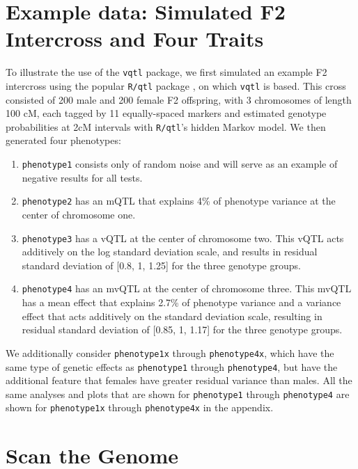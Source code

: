\documentclass[9pt,twocolumn,twoside]{gsag3jnl}
\begin{document}
\section*{Example data: Simulated F2 Intercross and Four Traits}

To illustrate the use of the \texttt{vqtl} package, we first simulated an example F2 intercross using the popular \texttt{R/qtl} package \citep{Broman2003}, on which \texttt{vqtl} is based.
This cross consisted of 200 male and 200 female F2 offspring, with 3 chromosomes of length 100 cM, each tagged by 11 equally-spaced markers and estimated genotype probabilities at 2cM intervals with \texttt{R/qtl}'s hidden Markov model. We then generated four phenotypes:
\begin{enumerate}
	\item \texttt{phenotype1} consists only of random noise and will serve as an example of negative results for all tests.
	\item \texttt{phenotype2} has an mQTL that explains 4\% of phenotype variance at the center of chromosome one.
	\item \texttt{phenotype3} has a vQTL at the center of chromosome two.
        This vQTL acts additively on the log standard deviation scale, and results in residual standard deviation of [0.8, 1, 1.25] for the three genotype groups.
	\item \texttt{phenotype4} has an mvQTL at the center of chromosome three.
        This mvQTL has a mean effect that explains 2.7\% of phenotype variance and a variance effect that acts additively on the standard deviation scale, resulting in residual standard deviation of [0.85, 1, 1.17] for the three genotype groups.
\end{enumerate}

We additionally consider \texttt{phenotype1x} through \texttt{phenotype4x}, which have the same type of genetic effects as \texttt{phenotype1} through \texttt{phenotype4}, but have the additional feature that females have greater residual variance than males.
All the same analyses and plots that are shown for \texttt{phenotype1} through \texttt{phenotype4} are shown for \texttt{phenotype1x} through \texttt{phenotype4x} in the appendix.

\section*{Scan the Genome}
\end{document}
